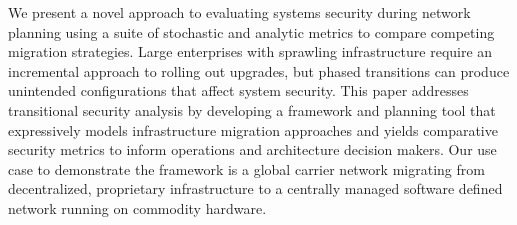 
We present a novel approach to evaluating systems security during network planning using a suite of stochastic and analytic metrics to compare competing migration strategies. Large enterprises with sprawling infrastructure require an incremental approach to rolling out upgrades, but phased transitions can produce unintended configurations that affect system security. This paper addresses transitional security analysis by developing a framework and planning tool that expressively models infrastructure migration approaches and yields comparative security metrics to inform operations and architecture decision makers. Our use case to demonstrate the framework is a global carrier network migrating from decentralized, proprietary infrastructure to a centrally managed software defined network running on commodity hardware.
